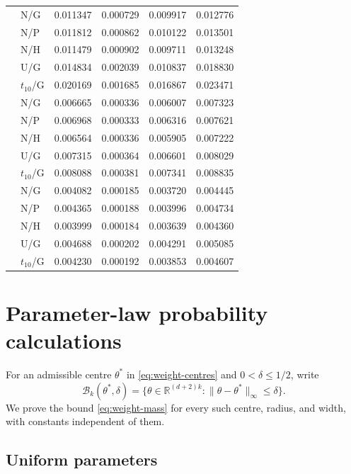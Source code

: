 \documentclass[11pt,a4paper]{article}
\theoremstyle{remark}
\newcommand{\norm}[1]{\lVert#1\rVert}
\begin{document}
\begin{table}[H]
\begin{tabular}{@{}rlrrrr@{}}
\addlinespace[3pt]
1024 & N/G & 0.011347 & 0.000729 & 0.009917 & 0.012776\\
 & N/P & 0.011812 & 0.000862 & 0.010122 & 0.013501\\
 & N/H & 0.011479 & 0.000902 & 0.009711 & 0.013248\\
 & U/G & 0.014834 & 0.002039 & 0.010837 & 0.018830\\
 & $t_{10}$/G & 0.020169 & 0.001685 & 0.016867 & 0.023471\\
\addlinespace[3pt]
2048 & N/G & 0.006665 & 0.000336 & 0.006007 & 0.007323\\
 & N/P & 0.006968 & 0.000333 & 0.006316 & 0.007621\\
 & N/H & 0.006564 & 0.000336 & 0.005905 & 0.007222\\
 & U/G & 0.007315 & 0.000364 & 0.006601 & 0.008029\\
 & $t_{10}$/G & 0.008088 & 0.000381 & 0.007341 & 0.008835\\
\addlinespace[3pt]
4096 & N/G & 0.004082 & 0.000185 & 0.003720 & 0.004445\\
 & N/P & 0.004365 & 0.000188 & 0.003996 & 0.004734\\
 & N/H & 0.003999 & 0.000184 & 0.003639 & 0.004360\\
 & U/G & 0.004688 & 0.000202 & 0.004291 & 0.005085\\
 & $t_{10}$/G & 0.004230 & 0.000192 & 0.003853 & 0.004607\\
\bottomrule
\end{tabular}
\end{table}

\clearpage

\section{Parameter-law probability calculations}
\label{app:weight-boxes}

For an admissible centre $\theta^*$ in
\eqref{eq:weight-centres} and $0<\delta\leq1/2$, write
\[
\mathcal B_k(\theta^*,\delta)=
\{\theta\in\mathbb R^{(d+2)k}:
\norm{\theta-\theta^*}_\infty\leq\delta\}.
\]
We prove the bound \eqref{eq:weight-mass} for every such centre,
radius, and width, with constants independent of them.

\subsection{Uniform parameters}
\end{document}
